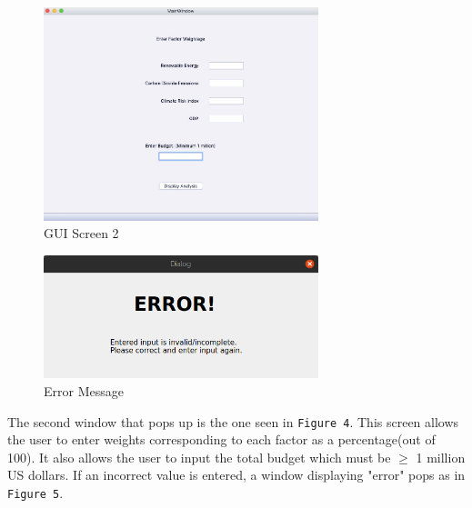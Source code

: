 \documentclass[fontsize=11pt]{article}
\begin{document}
    \begin{figure}[H]
        \centering
        \includegraphics[width=8cm]{Figure 5.jpeg}
        \caption{GUI Screen 2}
    \end{figure}
    \begin{figure}[H]
        \centering
        \includegraphics[width=8cm]{Figure 6.png}
        \caption{Error Message}
    \end{figure}
    
    The second window that pops up is the one seen in \texttt{Figure 4}. This screen allows the user to enter weights corresponding to
    each factor as a percentage(out of 100). It also allows the user to input the total budget which must be $\geq$ 1 million US
    dollars. If an incorrect value is entered, a window displaying "error" pops as in \texttt{Figure 5}.\newline
    
\end{document}
